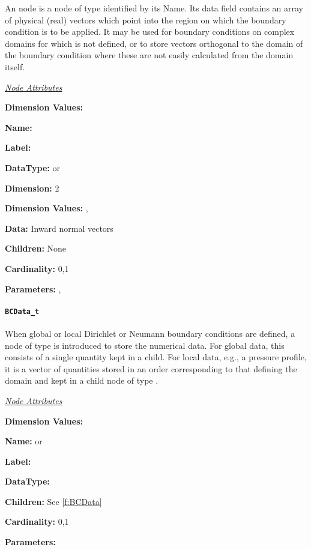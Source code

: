 An  node is a node of type 
identified by its Name. Its data field contains an array of
physical (real) vectors which point into the region on which the
boundary condition is to be applied.  It may be used for boundary
conditions on complex domains for which  is not
defined, or to store vectors orthogonal to the domain of the boundary
condition where these are not easily calculated from the domain itself.

\textit{\uline{Node Attributes}}
\begin{Ventryic}{\textbf{Dimension Values:}}
\item [\textbf{Name:}]
\item [\textbf{Label:}]
\item [\textbf{DataType:}]
       or 
\item [\textbf{Dimension:}]
      2
\item [\textbf{Dimension Values:}]
      , 
\item [\textbf{Data:}]
      Inward normal vectors
\item [\textbf{Children:}]
      None
\item [\textbf{Cardinality:}]
      0,1
\item [\textbf{Parameters:}]
      , 
\end{Ventryic}

\paragraph{\texttt{BCData\_t}}

When global or local Dirichlet or Neumann boundary conditions are
defined, a node of type  is introduced to store the
numerical data. For global data, this consists of a single quantity kept
in a  child. For local
data, e.g., a pressure profile, it is a vector of quantities stored in
an order corresponding to that defining the domain and kept in a child
node of type .

\textit{\uline{Node Attributes}}
\begin{Ventryic}{\textbf{Dimension Values:}}
\item [\textbf{Name:}]
       or 
\item [\textbf{Label:}]
\item [\textbf{DataType:}]
\item [\textbf{Children:}]
      See \autoref{f:BCData}
\item [\textbf{Cardinality:}]
      0,1
\item [\textbf{Parameters:}]
\end{Ventryic}

